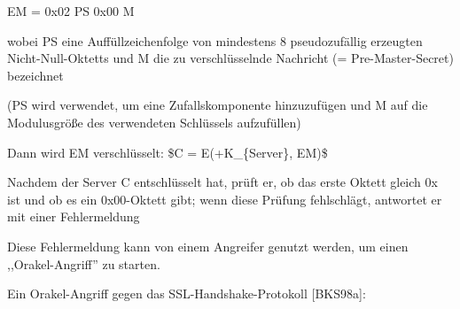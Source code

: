 \documentclass[a4paper]{article}
\begin{document}
\begin{multicols}{3}
\begin{itemize*}
\begin{itemize*}
                  \begin{itemize*}
                        \item EM = 0x02 \textbar{} PS \textbar{} 0x00 \textbar{} M
                        \begin{itemize*} \item wobei PS eine Auffüllzeichenfolge von mindestens 8 pseudozufällig erzeugten Nicht-Null-Oktetts und M die zu verschlüsselnde Nachricht (= Pre-Master-Secret) bezeichnet \item (PS wird verwendet, um eine Zufallskomponente hinzuzufügen und M auf die Modulusgröße des verwendeten Schlüssels aufzufüllen) \end{itemize*}
                        \item Dann wird EM verschlüsselt: \$C = E(+K\_\{Server\}, EM)\$
                        \item Nachdem der Server C entschlüsselt hat, prüft er, ob das erste Oktett gleich 0x ist und ob es ein 0x00-Oktett gibt; wenn diese Prüfung fehlschlägt, antwortet er mit einer Fehlermeldung
                        \item Diese Fehlermeldung kann von einem Angreifer genutzt werden, um einen ,,Orakel-Angriff'' zu starten.
                  \end{itemize*}
                  \item
                  Ein Orakel-Angriff gegen das SSL-Handshake-Protokoll {[}BKS98a{]}:


\end{itemize*}
\end{itemize*}
\end{multicols}
\end{document}
